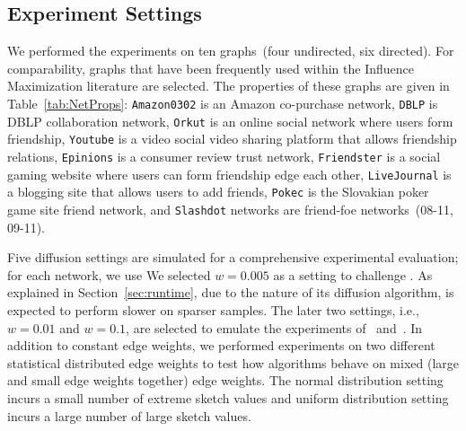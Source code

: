 \subsection{Experiment Settings} \label{sec:expset}

We performed the experiments on ten graphs~(four undirected, six directed). For comparability, graphs that have been frequently used within the Influence Maximization literature are selected. The properties of these graphs are given in Table~\ref{tab:NetProps}:  {\tt Amazon0302} is an Amazon co-purchase network, {\tt DBLP} is DBLP collaboration network, {\tt Orkut} is an online social network where users form friendship,  {\tt Youtube} is a video social video sharing platform that allows friendship relations, {\tt Epinions} is a consumer review trust network, {\tt Friendster} is a social gaming website where users can form friendship edge each other, {\tt LiveJournal} is a blogging site that allows users to add friends, {\tt Pokec} is the Slovakian poker game site friend network, and {\tt Slashdot} networks are friend-foe networks~(08-11, 09-11).

Five diffusion settings are simulated for a comprehensive experimental evaluation; for each network, we use 
\noindent We selected $w=0.005$ as a setting to challenge \acro. As explained in Section~\ref{sec:runtime}, due to the nature of its diffusion algorithm, \acro is expected to perform slower on sparser samples. The later two settings, i.e., $w = 0.01$  and $w = 0.1$, are selected to emulate the experiments of~\cite{kempe2003maximizing} and~\cite{MixGreedy}. In addition to constant edge weights, we performed experiments on two different statistical distributed edge weights to test how algorithms behave on mixed (large and small edge weights together) edge weights. The normal distribution setting incurs a small number of extreme sketch values and uniform distribution setting incurs a large number of large sketch values.

